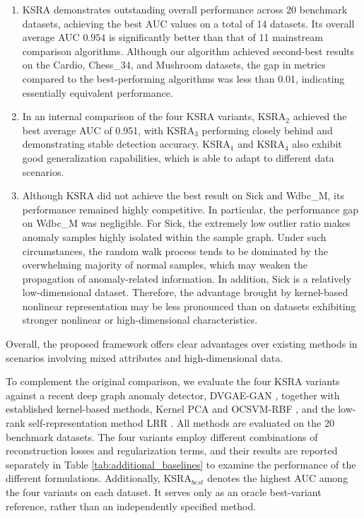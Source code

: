 \documentclass[ASNA,twocolumn]{USG} %
\begin{document}
\begin{enumerate}[\indent (1)]
    \item KSRA demonstrates outstanding overall performance across 20 benchmark datasets, achieving the best AUC values on a total of 14 datasets. Its overall average AUC $0.954$ is significantly better than that of 11 mainstream comparison algorithms. Although our algorithm achieved second-best results on the Cardio, Chess\_34, and Mushroom datasets, the gap in metrics compared to the best-performing algorithms was less than 0.01, indicating essentially equivalent performance.
    \item In an internal comparison of the four KSRA variants, KSRA$_2$ achieved the best average AUC of 0.951, with KSRA$_3$ performing closely behind and demonstrating stable detection accuracy. KSRA$_1$ and KSRA$_4$ also exhibit good generalization capabilities, which is able to adapt to different data scenarios.
    \item Although KSRA did not achieve the best result on Sick and Wdbc\_M, its performance remained highly competitive. In particular, the performance gap on Wdbc\_M was negligible. For Sick, the extremely low outlier ratio makes anomaly samples highly isolated within the sample graph. Under such circumstances, the random walk process tends to be dominated by the overwhelming majority of normal samples, which may weaken the propagation of anomaly-related information. In addition, Sick is a relatively low-dimensional dataset. Therefore, the advantage brought by kernel-based nonlinear representation may be less pronounced than on datasets exhibiting stronger nonlinear or high-dimensional characteristics.
\end{enumerate}
Overall, the proposed framework offers clear advantages over existing methods in scenarios involving mixed attributes and high-dimensional data.

To complement the original comparison, we evaluate the four KSRA variants against a recent deep graph anomaly detector, DVGAE-GAN \cite{khan2024anomalous}, together with established kernel-based methods, Kernel PCA \cite{hoffmann2007kernel} and OCSVM-RBF \cite{scholkopf2001estimating}, and the low-rank self-representation method LRR \cite{liu2012exact}. All methods are evaluated on the 20 benchmark datasets. The four variants employ different combinations of reconstruction losses and regularization terms, and their results are reported separately in Table \ref{tab:additional_baselines} to examine the performance
of the different formulations. Additionally, KSRA$_{best}$ denotes the highest AUC among the four variants on each dataset. It serves only as an oracle best-variant reference, rather than an independently specified method.
\end{document}
